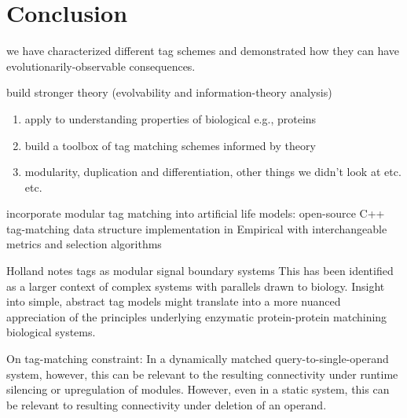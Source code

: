 \section{Conclusion}

we have characterized different tag schemes and demonstrated how they can have evolutionarily-observable consequences.

build stronger theory (evolvability and information-theory analysis)
\begin{enumerate}
\item  apply to understanding properties of biological e.g., proteins
\item  build a toolbox of tag matching schemes informed by theory
\item  modularity, duplication and differentiation, other things we didn't look at etc. etc.
\end{enumerate}

incorporate modular tag matching into artificial life models: open-source C++ tag-matching data structure implementation in Empirical with interchangeable metrics and selection algorithms

Holland notes tags as modular signal boundary systems \citep{holland2012signals}
This has been identified as a larger context of complex systems with parallels drawn to biology.
Insight into simple, abstract tag models might translate into a more nuanced appreciation of the principles underlying enzymatic protein-protein matchining biological systems.

On tag-matching constraint:
In a dynamically matched query-to-single-operand system, however, this can be relevant to the resulting connectivity under runtime silencing or upregulation of modules.
However, even in a static system, this can be relevant to resulting connectivity under deletion of an operand.

